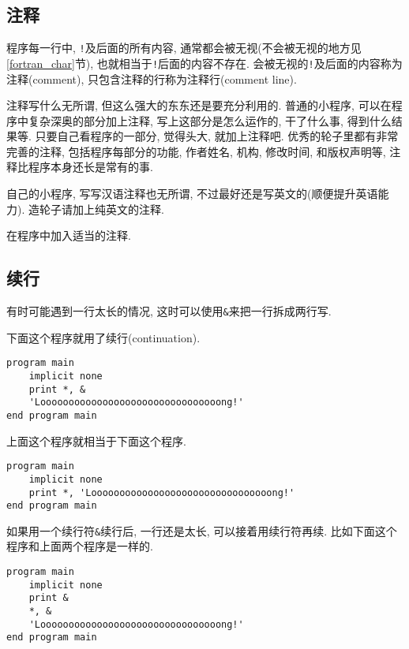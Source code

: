 \subsection{注释}

程序每一行中, \texttt{!}及后面的所有内容, 通常都会被无视(不会被无视的地方见\ref{fortran_char}节), 也就相当于\texttt{!}后面的内容不存在. 会被无视的\texttt{!}及后面的内容称为注释(comment), 只包含注释的行称为注释行(comment line).

注释写什么无所谓, 但这么强大的东东还是要充分利用的. 普通的小程序, 可以在程序中复杂深奥的部分加上注释, 写上这部分是怎么运作的, 干了什么事, 得到什么结果等. 只要自己看程序的一部分, 觉得头大, 就加上注释吧. 优秀的轮子里都有非常完善的注释, 包括程序每部分的功能, 作者姓名, 机构, 修改时间, 和版权声明等, 注释比程序本身还长是常有的事.

自己的小程序, 写写汉语注释也无所谓, 不过最好还是写英文的(顺便提升英语能力). 造轮子请加上纯英文的注释.

\begin{convention}
    在程序中加入适当的注释.
\end{convention}

\subsection{续行}

有时可能遇到一行太长的情况, 这时可以使用\texttt{\&{}}来把一行拆成两行写.

下面这个程序就用了续行(continuation).
\begin{lstlisting}
program main
    implicit none
    print *, &
    'Loooooooooooooooooooooooooooooooong!'
end program main
\end{lstlisting}
上面这个程序就相当于下面这个程序.
\begin{lstlisting}
program main
    implicit none
    print *, 'Loooooooooooooooooooooooooooooooong!'
end program main
\end{lstlisting}

如果用一个续行符\texttt{\&{}}续行后, 一行还是太长, 可以接着用续行符再续. 比如下面这个程序和上面两个程序是一样的.
\begin{lstlisting}
program main
    implicit none
    print &
    *, &
    'Loooooooooooooooooooooooooooooooong!'
end program main
\end{lstlisting}

